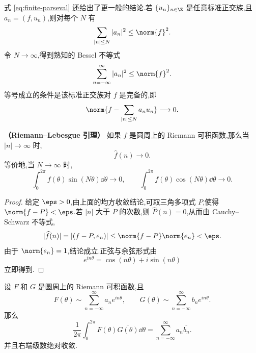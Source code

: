 式 \eqref{eq:finite-parseval} 还给出了更一般的结论.若 $\{u_n\}_{n\in\Z}$ 是任意标准正交族,且 $a_n=(f,u_n)$,则对每个 $N$ 有
\[
\sum_{|n|\leq N}|a_n|^2\leq\norm{f}^2.
\]
令 $N\to\infty$,得到熟知的 Bessel 不等式
\[
\sum_{n=-\infty}^{\infty}|a_n|^2\leq\norm{f}^2.
\]
等号成立的条件是该标准正交族对 $f$ 是完备的,即
\[
\norm{f-\sum_{|n|\leq N}a_nu_n}\longrightarrow0.
\]

\begin{lemma}
	\textbf{（Riemann--Lebesgue 引理）}
	如果 $f$ 是圆周上的 Riemann 可积函数,那么当 $|n|\to\infty$ 时,
	\[
	\widehat f(n)\longrightarrow0.
	\]
	等价地,当 $N\to\infty$ 时,
	\[
	\int_0^{2\pi}f(\theta)\sin(N\theta)\dd\theta\longrightarrow0,
	\qquad
	\int_0^{2\pi}f(\theta)\cos(N\theta)\dd\theta\longrightarrow0.
	\]
\end{lemma}

\begin{proof}
	给定 $\eps>0$,由上面的均方收敛结论,可取三角多项式 $P$,使得 $\norm{f-P}<\eps$.若 $|n|$ 大于 $P$ 的次数,则 $\widehat P(n)=0$,从而由 Cauchy--Schwarz 不等式,
	\[
	|\widehat f(n)|
	=|(f-P,e_n)|
	\leq\norm{f-P}\norm{e_n}
	<\eps.
	\]
	由于 $\norm{e_n}=1$,结论成立.正弦与余弦形式由
	\[
	e^{in\theta}=\cos(n\theta)+i\sin(n\theta)
	\]
	立即得到.
\end{proof}

\begin{lemma}\label{Parseval 等式的双线性形式}
	设 $F$ 和 $G$ 是圆周上的 Riemann 可积函数,且
	\[
	F(\theta)\sim\sum_{n=-\infty}^{\infty}a_ne^{in\theta},
	\qquad
	G(\theta)\sim\sum_{n=-\infty}^{\infty}b_ne^{in\theta}.
	\]
	那么
	\[\frac1{2\pi}\int_0^{2\pi}F(\theta)\overline{G(\theta)}\dd\theta
	=\sum_{n=-\infty}^{\infty}a_n\overline{b_n}.
	\]
	并且右端级数绝对收敛.
\end{lemma}

